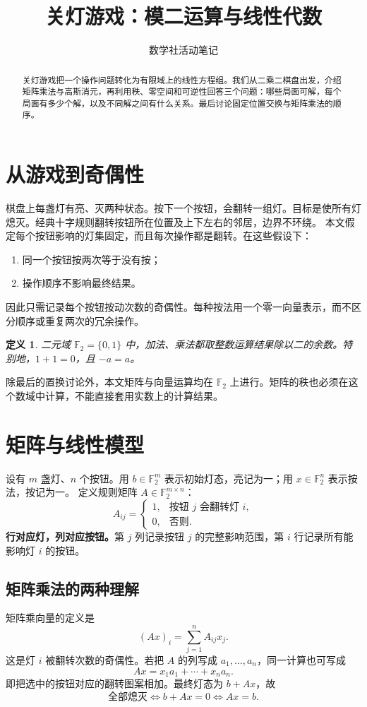 \documentclass[UTF8,fontset=fandol,11pt,a4paper]{ctexart}
\title{关灯游戏：模二运算与线性代数}
\author{数学社活动笔记}
\date{}
\newtheorem{definition}{定义}[section]
\newcommand{\F}{\mathbb F_2}
\begin{document}
\maketitle
\begin{abstract}
关灯游戏把一个操作问题转化为有限域上的线性方程组。我们从二乘二棋盘出发，介绍矩阵乘法与高斯消元，再利用秩、零空间和可逆性回答三个问题：哪些局面可解，每个局面有多少个解，以及不同解之间有什么关系。最后讨论固定位置交换与矩阵乘法的顺序。
\end{abstract}
\section{从游戏到奇偶性}
棋盘上每盏灯有亮、灭两种状态。按下一个按钮，会翻转一组灯。目标是使所有灯熄灭。经典十字规则翻转按钮所在位置及上下左右的邻居，边界不环绕。
本文假定每个按钮影响的灯集固定，而且每次操作都是翻转。在这些假设下：
\begin{enumerate}
\item 同一个按钮按两次等于没有按；
\item 操作顺序不影响最终结果。
\end{enumerate}
因此只需记录每个按钮按动次数的奇偶性。每种按法用一个零一向量表示，而不区分顺序或重复两次的冗余操作。
\begin{definition}
二元域 $\F=\{0,1\}$ 中，加法、乘法都取整数运算结果除以二的余数。特别地，$1+1=0$，且 $-a=a$。
\end{definition}
除最后的置换讨论外，本文矩阵与向量运算均在 $\F$ 上进行。矩阵的秩也必须在这个数域中计算，不能直接套用实数上的计算结果。
\section{矩阵与线性模型}
设有 $m$ 盏灯、$n$ 个按钮。用 $b\in\F^m$ 表示初始灯态，亮记为一；用 $x\in\F^n$ 表示按法，按记为一。
定义规则矩阵 $A\in\F^{m\times n}$：
\[
 A_{ij}=\begin{cases}1,&\text{按钮 $j$ 会翻转灯 $i$},\\0,&\text{否则}.\end{cases}
\]
\textbf{行对应灯，列对应按钮。}第 $j$ 列记录按钮 $j$ 的完整影响范围，第 $i$ 行记录所有能影响灯 $i$ 的按钮。
\subsection{矩阵乘法的两种理解}
矩阵乘向量的定义是
\[
(Ax)_i=\sum_{j=1}^n A_{ij}x_j.
\]
这是灯 $i$ 被翻转次数的奇偶性。若把 $A$ 的列写成 $a_1,\ldots,a_n$，同一计算也可写成
\[
 Ax=x_1a_1+\cdots+x_na_n.
\]
即把选中的按钮对应的翻转图案相加。最终灯态为 $b+Ax$，故
\[
 \boxed{\text{全部熄灭}\iff b+Ax=0\iff Ax=b.}
\]
\end{document}
